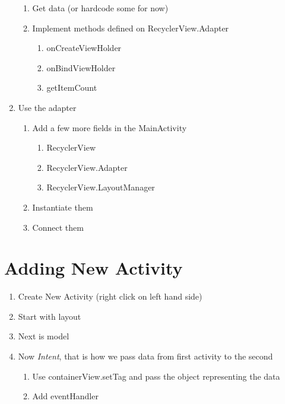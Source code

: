 \begin{enumerate}
\begin{enumerate}
		      \item Get data (or hardcode some for now)
		      \item Implement methods defined on RecyclerView.Adapter
		            \begin{enumerate}
			            \item onCreateViewHolder
			            \item onBindViewHolder
			            \item getItemCount
		            \end{enumerate}
	      \end{enumerate}
	\item Use the adapter
	      \begin{enumerate}
		      \item Add a few more fields in the MainActivity
		            \begin{enumerate}
			            \item RecyclerView
			            \item RecyclerView.Adapter
			            \item RecyclerView.LayoutManager
		            \end{enumerate}
		      \item Instantiate them
		      \item Connect them
	      \end{enumerate}
\end{enumerate}

\section{Adding New Activity}
\begin{enumerate}
	\item Create New Activity (right click on left hand side)
	\item Start with layout
	\item Next is model
	\item Now \emph{Intent}, that is how we pass data from first activity to the second
	      \begin{enumerate}
		      \item Use containerView.setTag and pass the object representing the data
		      \item Add eventHandler
	      \end{enumerate}
\end{enumerate}